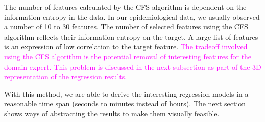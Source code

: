 \documentclass[journal]{style/vgtc} 			          %
\newcommand{\magenta}[1]{\textcolor{magenta}{#1}}
\begin{document}
The number of features calculated by the CFS algorithm is dependent on the information entropy in the data.
In our epidemiological data, we usually observed a number of 10 to 30 features.
The number of selected features using the CFS algorithm reflects their information entropy on the target.
A large list of features is an expression of low correlation to the target feature.
\magenta{
The tradeoff involved using the CFS algorithm is the potential removal of interesting features for the domain expert.
This problem is discussed in the next subsection as part of the 3D representation of the regression results.
}

With this method, we are able to derive the interesting regression models in a reasonable time span (seconds to minutes instead of hours).
The next section shows ways of abstracting the results to make them visually feasible.

\end{document}
